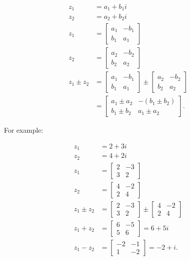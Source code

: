 $$
\begin{aligned}
z_{1} & =a_{1}+b_{1} i \\
z_{2} & =a_{2}+b_{2} i \\
z_{1} & =\left[\begin{array}{cc}
a_{1} & -b_{1} \\
b_{1} & a_{1}
\end{array}\right] \\
z_{2} & =\left[\begin{array}{cc}
a_{2} & -b_{2} \\
b_{2} & a_{2}
\end{array}\right] \\
z_{1} \pm z_{2} & =\left[\begin{array}{cc}
a_{1} & -b_{1} \\
b_{1} & a_{1}
\end{array}\right] \pm\left[\begin{array}{cc}
a_{2} & -b_{2} \\
b_{2} & a_{2}
\end{array}\right] \\
& =\left[\begin{array}{ll}
a_{1} \pm a_{2} & -\left(b_{1} \pm b_{2}\right) \\
b_{1} \pm b_{2} & a_{1} \pm a_{2}
\end{array}\right] .
\end{aligned}
$$

For example:

$$
\begin{aligned}
z_{1} & =2+3 i \\
z_{2} & =4+2 i \\
z_{1} & =\left[\begin{array}{cc}
2 & -3 \\
3 & 2
\end{array}\right] \\
z_{2} & =\left[\begin{array}{cc}
4 & -2 \\
2 & 4
\end{array}\right] \\
z_{1} \pm z_{2} & =\left[\begin{array}{cc}
2 & -3 \\
3 & 2
\end{array}\right] \pm\left[\begin{array}{cc}
4 & -2 \\
2 & 4
\end{array}\right] \\
z_{1}+z_{2} & =\left[\begin{array}{cc}
6 & -5 \\
5 & 6
\end{array}\right]=6+5 i \\
z_{1}-z_{2} & =\left[\begin{array}{cc}
-2 & -1 \\
1 & -2
\end{array}\right]=-2+i .
\end{aligned}
$$

